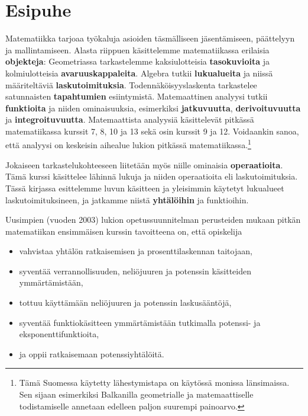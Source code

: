 
\chapter{Esipuhe}



Matematiikka tarjoaa työkaluja asioiden täsmälliseen jäsentämiseen, päättelyyn ja mallintamiseen. Alasta riippuen käsittelemme matematiikassa erilaisia \textbf{objekteja}: Geometriassa tarkastelemme kaksiulotteisia \textbf{tasokuvioita} ja kolmiulotteisia \textbf{avaruuskappaleita}. Algebra tutkii \textbf{lukualueita} ja niissä määriteltäviä \textbf{laskutoimituksia}. Todennäköisyyslaskenta tarkastelee satunnaisten \textbf{tapahtumien} esiintymistä. Matemaattinen analyysi tutkii \textbf{funktioita} ja niiden ominaisuuksia, esimerkiksi \textbf{jatkuvuutta}, \textbf{derivoituvuutta} ja \textbf{integroituvuutta}. Matemaattista analyysiä käsittelevät pitkässä matematiikassa kurssit 7, 8, 10 ja 13 sekä osin kurssit 9 ja 12. Voidaankin sanoa, että analyysi on keskeisin aihealue lukion pitkässä matematiikassa.\footnote[1]{Tämä Suomessa käytetty lähestymistapa on käytössä monissa länsimaissa. Sen sijaan esimerkiksi Balkanilla geometrialle ja matemaattiselle todistamiselle annetaan edelleen paljon suurempi painoarvo.}

Jokaiseen tarkastelukohteeseen liitetään myös niille ominaisia \textbf{operaatioita}. Tämä kurssi käsittelee lähinnä lukuja ja niiden operaatioita eli laskutoimituksia. Tässä kirjassa esittelemme luvun käsitteen ja yleisimmin käytetyt lukualueet laskutoimituksineen, ja jatkamme niistä \textbf{yhtälöihin} ja funktioihin.

Uusimpien (vuoden 2003) lukion opetussuunnitelman perusteiden mukaan pitkän matematiikan ensimmäisen kurssin tavoitteena on, että opiskelija
\begin{itemize}
\item vahvistaa yhtälön ratkaisemisen ja prosenttilaskennan taitojaan,
\item syventää verrannollisuuden, neliöjuuren ja potenssin käsitteiden ymmärtämistään,
\item tottuu käyttämään neliöjuuren ja potenssin laskusääntöjä,
\item syventää funktiokäsitteen ymmärtämistään tutkimalla potenssi- ja eksponenttifunktioita,
\item ja oppii ratkaisemaan potenssiyhtälöitä.
\end{itemize}

